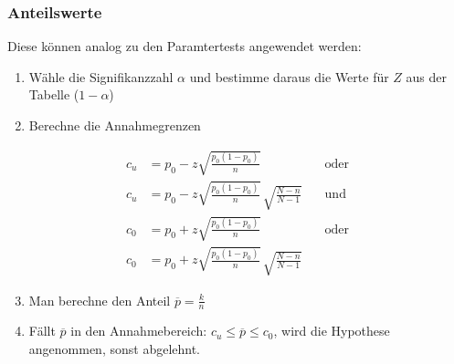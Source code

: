 \subsubsection{Anteilswerte}
Diese können analog zu den Paramtertests angewendet werden:
\begin{enumerate}
\item Wähle die Signifikanzzahl $\alpha$ und bestimme daraus die Werte für $Z$ aus der Tabelle ($1-\alpha$)
\item Berechne die Annahmegrenzen 
\end{enumerate}
\begin{align}
c_u &= p_0 - z\displaystyle\sqrt{\frac{p_0(1-p_0)}{n}}&\quad\mbox{oder} \\
c_u &= p_0 - z\displaystyle\sqrt{\frac{p_0(1-p_0)}{n}}\,\sqrt{\frac{N-n}{N-1}}&\quad\mbox{und} \\
c_0&=p_0 + z\displaystyle\sqrt{\frac{p_0(1-p_0)}{n}}&\quad\mbox{oder} \\
c_0&= p_0 + z \displaystyle\sqrt{\frac{p_0(1-p_0)}{n}}\,\sqrt{\frac{N-n}{N-1}}&
\end{align}
\begin{enumerate}
  \setcounter{enumi}{2}
  \item Man berechne den Anteil $\overline{p}=\frac{k}{n}$
  \item Fällt $\overline{p}$ in den Annahmebereich: $c_u\leq\overline{p}\leq c_0$, wird die Hypothese angenommen, sonst abgelehnt.
\end{enumerate}
